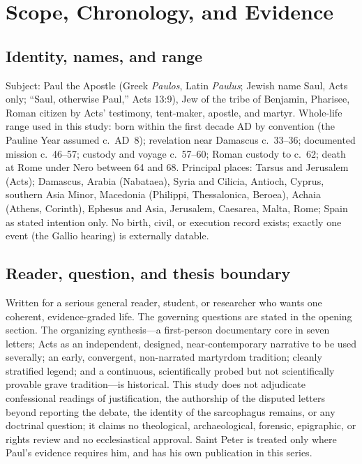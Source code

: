 \section{Scope, Chronology, and Evidence}

\subsection{Identity, names, and range}

Subject: Paul the Apostle (Greek \textit{Paulos}, Latin \textit{Paulus};
Jewish name Saul, Acts only; ``Saul, otherwise Paul,'' Acts 13:9), Jew of
the tribe of Benjamin, Pharisee, Roman citizen by Acts' testimony,
tent-maker, apostle, and martyr. Whole-life range used in this study:
born within the first decade AD by convention (the Pauline Year assumed
c.~AD~8); revelation near Damascus c.~33--36; documented mission c.~46--57;
custody and voyage c.~57--60; Roman custody to c.~62; death at Rome under
Nero between 64 and 68. Principal places: Tarsus and Jerusalem (Acts);
Damascus, Arabia (Nabataea), Syria and Cilicia, Antioch, Cyprus, southern
Asia Minor, Macedonia (Philippi, Thessalonica, Beroea), Achaia (Athens,
Corinth), Ephesus and Asia, Jerusalem, Caesarea, Malta, Rome; Spain as
stated intention only. No birth, civil, or execution record exists;
exactly one event (the Gallio hearing) is externally datable.

\subsection{Reader, question, and thesis boundary}

Written for a serious general reader, student, or researcher who wants
one coherent, evidence-graded life. The governing questions are stated in
the opening section. The organizing synthesis---a first-person
documentary core in seven letters; Acts as an independent, designed,
near-contemporary narrative to be used severally; an early, convergent,
non-narrated martyrdom tradition; cleanly stratified legend; and a
continuous, scientifically probed but not scientifically provable grave
tradition---is historical. This study does not adjudicate confessional
readings of justification, the authorship of the disputed letters beyond
reporting the debate, the identity of the sarcophagus remains, or any
doctrinal question; it claims no theological, archaeological, forensic,
epigraphic, or rights review and no ecclesiastical approval. Saint Peter
is treated only where Paul's evidence requires him, and has his own
publication in this series.

